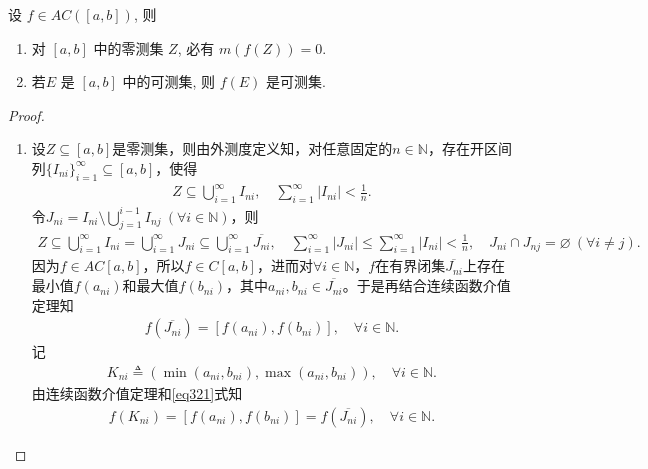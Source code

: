 \documentclass[../../main.tex]{subfiles}%
\begin{document}
\begin{proposition}\label{proposition:绝对连续函数零测集的像仍零测}
设 $f\in  AC([a,b])$, 则
\begin{enumerate}[(1)]
\item\label{proposition:绝对连续函数零测集的像仍零测-1} 对 $[a,b]$ 中的零测集 $Z$, 必有 $m(f(Z))=0$.

\item\label{proposition:绝对连续函数零测集的像仍零测-2} 若$E$ 是 $[a,b]$ 中的可测集, 则 $f(E)$ 是可测集.
\end{enumerate}
\end{proposition}
\begin{proof}
\begin{enumerate}[(1)]
\item 设$Z\subseteq [a,b]$是零测集，则由外测度定义知，对任意固定的$n\in \mathbb{N}$，存在开区间列$\{I_{ni}\}_{i=1}^{\infty}\subseteq [a,b]$，使得
\begin{align*}
Z\subseteq \bigcup\limits_{i=1}^{\infty}I_{ni},\quad \sum\limits_{i=1}^{\infty}|I_{ni}|<\frac{1}{n}.
\end{align*}
令$J_{ni}=I_{ni}\setminus \bigcup\limits_{j=1}^{i-1}I_{nj}\ (\forall i\in \mathbb{N})$，则
\begin{align}
Z\subseteq \bigcup\limits_{i=1}^{\infty}I_{ni}=\bigcup\limits_{i=1}^{\infty}J_{ni}\subseteq \bigcup\limits_{i=1}^{\infty}\overline{J_{ni}},\quad \sum\limits_{i=1}^{\infty}|J_{ni}|\leqslant \sum\limits_{i=1}^{\infty}|I_{ni}|<\frac{1}{n},\quad J_{ni}\cap J_{nj}=\varnothing\ (\forall i\neq j). \label{eq::::--234823urjreosew1}
\end{align}
因为$f\in AC[a,b]$，所以$f\in C[a,b]$，进而对$\forall i\in \mathbb{N}$，$f$在有界闭集$\overline{J_{ni}}$上存在最小值$f(a_{ni})$和最大值$f(b_{ni})$，其中$a_{ni},b_{ni}\in \overline{J_{ni}}$。于是再结合连续函数介值定理知
\begin{align}
f\left( \overline{J_{ni}} \right) =\left[ f\left( a_{ni} \right) ,f\left( b_{ni} \right) \right],\quad \forall i\in \mathbb{N}. \label{eq321}
\end{align}
记
\begin{align*}
K_{ni}\triangleq \left( \min \left( a_{ni},b_{ni} \right) ,\max \left( a_{ni},b_{ni} \right) \right),\quad \forall i\in \mathbb{N}.
\end{align*}
由连续函数介值定理和\eqref{eq321}式知
\begin{align*}
f\left( K_{ni} \right) =\left[ f\left( a_{ni} \right) ,f\left( b_{ni} \right) \right] =f\left( \overline{J_{ni}} \right),\quad \forall i\in \mathbb{N}.

\end{align*}
\end{enumerate}
\end{proof}
\end{document}
